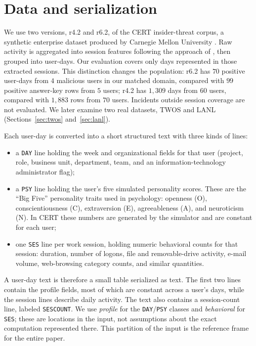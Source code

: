 \documentclass[10pt]{article} %
\begin{document}
\section{Data and serialization}
\label{sec:data}

We use two versions, r4.2 and r6.2, of the CERT insider-threat
corpus, a synthetic enterprise dataset produced by Carnegie Mellon
University \citep{certdataset,glasser2013bridging}. Raw activity is aggregated
into session features following the approach of \citet{le2020analyzing},
then grouped into user-days. Our evaluation covers only days represented
in those extracted sessions. This distinction changes the population:
r6.2 has $70$ positive user-days from $4$ malicious users in our matched
domain, compared with $99$ positive answer-key rows from $5$ users;
r4.2 has $1{,}309$ days from $60$ users, compared with $1{,}883$ rows from
$70$ users. Incidents outside session coverage are not evaluated.
We later examine two real datasets, TWOS and LANL
(Sections~\ref{sec:twos} and~\ref{sec:lanl}).

Each user-day is converted into a short structured text with three
kinds of lines:
\begin{itemize}
\item a \texttt{DAY} line holding the week and organizational fields for that
user (project, role, business unit, department, team, and an
information-technology administrator flag);
\item a \texttt{PSY} line holding the user's five simulated personality
scores. These are the ``Big Five'' personality traits used in
psychology: openness (O), conscientiousness (C), extraversion (E),
agreeableness (A), and neuroticism (N). In CERT these numbers are
generated by the simulator and are constant for each user;
\item one \texttt{SES} line per work session, holding numeric
behavioral counts for that session: duration, number of logons, file
and removable-drive activity, e-mail volume, web-browsing category
counts, and similar quantities.
\end{itemize}
A user-day text is therefore a small table serialized as text. The
first two lines contain the profile fields, most of which are constant
across a user's days, while the session lines describe daily activity.
The text also contains a session-count line, labeled \texttt{SESCOUNT}. We use \emph{profile} for the \texttt{DAY}/\texttt{PSY} classes
and \emph{behavioral} for \texttt{SES}; these are locations in the input,
not assumptions about the exact computation represented there. This
partition of the input is the reference frame for the entire paper.
\end{document}
